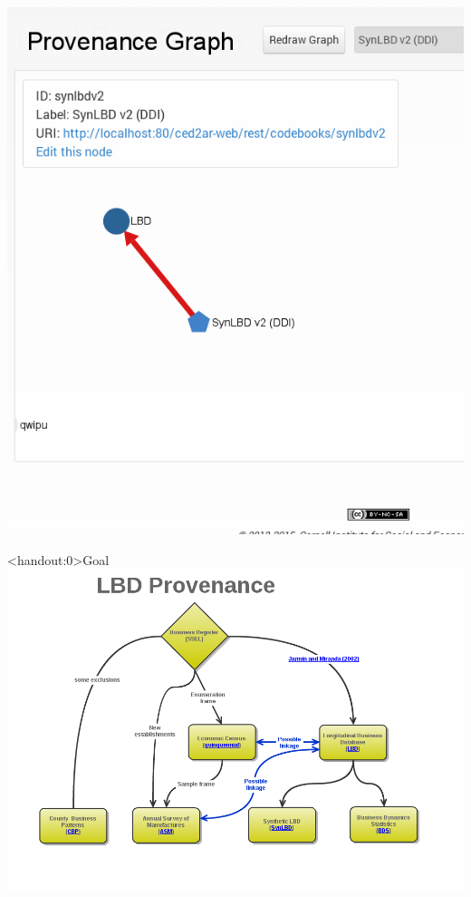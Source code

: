 \begin{frame}
\centering
\includegraphics[height=0.9\textheight]{Selection_082.png}
\end{frame}



\begin{frame}<handout:0>{Goal}
\centering
\includegraphics[height=0.8\textheight]{LBD_Provenance.png}
\end{frame}

